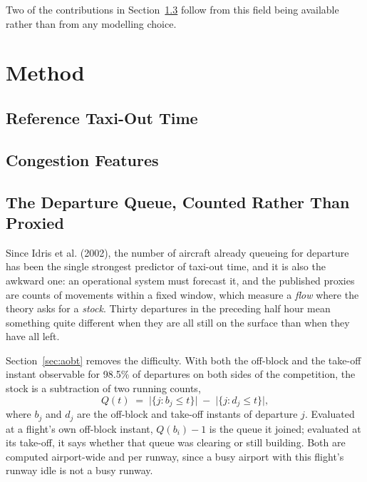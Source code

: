 \documentclass[
  manuscript=article,
  layout=preprint,
  year=2026,
  volume=x,
]{extra/joas}
\begin{document}
Two of the contributions in Section~\ref{sec:surface} follow from this field being
available rather than from any modelling choice.


\section{Method}
\subsection{Reference Taxi-Out Time}

\subsection{Congestion Features}

\subsection{The Departure Queue, Counted Rather Than Proxied}
\label{sec:surface}
Since Idris et al. (2002), the number of aircraft already queueing for departure has been
the single strongest predictor of taxi-out time, and it is also the awkward one: an
operational system must forecast it, and the published proxies are counts of movements
within a fixed window, which measure a \emph{flow} where the theory asks for a
\emph{stock}. Thirty departures in the preceding half hour mean something quite different
when they are all still on the surface than when they have all left.

Section~\ref{sec:aobt} removes the difficulty. With both the off-block and the take-off
instant observable for 98.5\% of departures on both sides of the competition, the stock
is a subtraction of two running counts,
\begin{equation}
Q(t) \;=\; \bigl|\{j : b_j \le t\}\bigr| \;-\; \bigl|\{j : d_j \le t\}\bigr| ,
\end{equation}
where $b_j$ and $d_j$ are the off-block and take-off instants of departure $j$. Evaluated
at a flight's own off-block instant, $Q(b_i) - 1$ is the queue it joined; evaluated at its
take-off, it says whether that queue was clearing or still building. Both are computed
airport-wide and per runway, since a busy airport with this flight's runway idle is not a
busy runway.
\end{document}
